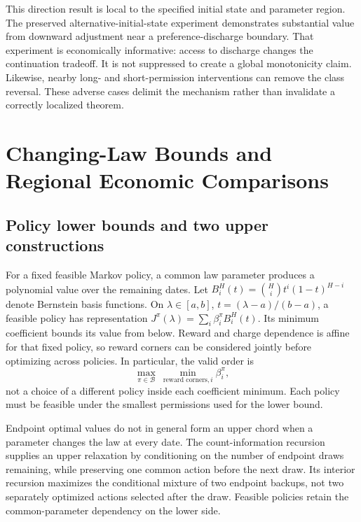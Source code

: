 This direction result is local to the specified initial state and parameter region. The preserved alternative-initial-state experiment demonstrates substantial value from downward adjustment near a preference-discharge boundary. That experiment is economically informative: access to discharge changes the continuation tradeoff. It is not suppressed to create a global monotonicity claim. Likewise, nearby long- and short-permission interventions can remove the class reversal. These adverse cases delimit the mechanism rather than invalidate a correctly localized theorem.

\section{Changing-Law Bounds and Regional Economic Comparisons}
\label{sec:r12_bounds}
\subsection{Policy lower bounds and two upper constructions}
For a fixed feasible Markov policy, a common law parameter produces a polynomial value over the remaining dates. Let $B_i^H(t)=\binom Hi t^i(1-t)^{H-i}$ denote Bernstein basis functions. On $\lambda\in[a,b]$, $t=(\lambda-a)/(b-a)$, a feasible policy has representation $J^\pi(\lambda)=\sum_i\beta_i^\pi B_i^H(t)$. Its minimum coefficient bounds its value from below. Reward and charge dependence is affine for that fixed policy, so reward corners can be considered jointly before optimizing across policies. In particular, the valid order is
\begin{equation}
 \max_{\pi\in\mathcal B}\ \min_{\text{reward corners},i}\beta_i^\pi,
 \label{eq:r12_order}
\end{equation}
not a choice of a different policy inside each coefficient minimum. Each policy must be feasible under the smallest permissions used for the lower bound.

Endpoint optimal values do not in general form an upper chord when a parameter changes the law at every date. The count-information recursion supplies an upper relaxation by conditioning on the number of endpoint draws remaining, while preserving one common action before the next draw. Its interior recursion maximizes the conditional mixture of two endpoint backups, not two separately optimized actions selected after the draw. Feasible policies retain the common-parameter dependency on the lower side.

